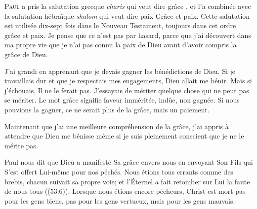 \dvrule







\lettrine{P}{aul} a pris la salutation grecque \emph{charis}
 qui veut dire \Og grâce \Fg{}, et l'a combinée avec la salutation
 hébraïque \emph{shalom} qui veut dire \Og paix \Fg{}\frcolon{} 
 \Og Grâce et paix. \Fg{}
 Cette salutation est utilisée dix-sept fois dans le Nouveau Testament,
 toujours dans cet ordre\frcolon{}  \Og grâce et paix. \Fg{}
 Je pense que ce n'est pas par hasard, parce que j'ai découvert
 dans ma propre vie que je n'ai pas connu la paix de Dieu
 avant d'avoir compris la grâce de Dieu.

J'ai grandi en apprenant que je devais gagner les bénédictions de Dieu.
 Si je travaillais dur et que je respectais mes engagements,
 Dieu allait me bénir. Mais si j'échouais, Il ne le ferait pas.
 J'essayais de mériter quelque chose qui ne peut pas se mériter.
 Le mot \Og grâce \Fg{} signifie \Og faveur imméritée, indûe,
 non gagnée. \Fg{} Si nous pouvions la gagner,
 ce ne serait plus de la grâce, mais un paiement.


Maintenant que j'ai une meilleure compréhension de la grâce,
 j'ai appris à attendre que Dieu me bénisse même si je suis pleinement
 conscient que je ne le mérite pas.

Paul nous dit que Dieu a manifesté Sa grâce envers nous en envoyant Son Fils
 qui S'est offert Lui-même pour nos péchés.
 \Og Nous étions tous errants comme des brebis, chacun suivait sa propre voie;
 et l'Éternel a fait retomber sur Lui la faute de nous tous \Fg{}
 ((53:6)).
 Lorsque nous étions encore pécheurs, Christ est mort
 \ocadr pas pour les gens biens, pas pour les gens vertueux,
 mais pour les gens mauvais.

